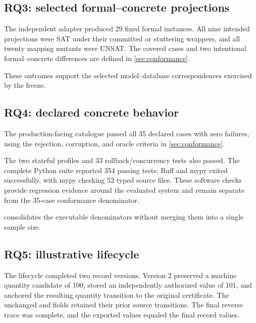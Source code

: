 \subsection{RQ3: selected formal--concrete projections}

The independent adapter produced 29 fixed formal instances. All nine intended projections were SAT under their committed or stuttering wrappers, and all twenty mapping mutants were UNSAT. The covered cases and two intentional formal--concrete differences are defined in \cref{sec:conformance}.

These outcomes support the selected model--database correspondences exercised by the freeze.

\subsection{RQ4: declared concrete behavior}

The production-facing catalogue passed all 35 declared cases with zero failures, using the rejection, corruption, and oracle criteria in \cref{sec:conformance}.

The two stateful profiles and 33 rollback/concurrency tests also passed. The complete Python suite reported 354 passing tests; Ruff and mypy exited successfully, with mypy checking 52 typed source files. These software checks provide regression evidence around the evaluated system and remain separate from the 35-case conformance denominator.



 consolidates the executable denominators without merging them into a single sample size.

\subsection{RQ5: illustrative lifecycle}

The lifecycle completed two record versions. Version 2 preserved a machine quantity candidate of 100, stored an independently authorized value of 101, and anchored the resulting quantity transition to the original certificate. The unchanged  and  fields retained their prior source transitions. The final reverse trace was complete, and the exported values equaled the final record values.

